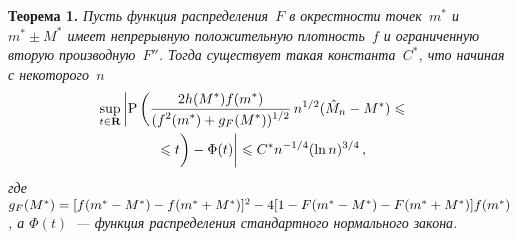 \begin{multicols}{2}
\medskip

\noindent
\textbf{Теорема 1.} \textit{Пусть функция распределения~$F$ в окрестности точек~$m^*$ 
и~$m^*\pm M^*$ имеет непрерывную положительную плотность~$f$ и ограниченную вторую 
производную~$F''$. Тогда существует такая константа~$C^*$, что начиная с некоторого~$n$
\begin{multline}
\!\!\!\sup\limits_{t\in\mathbf{R}}\left\vert\mathrm{P}\left(
\fr{2h(M^*)f(m^*)}{(f^2(m^*)+g_F(M^*))^{1/2}}\,
n^{1/2}(\hat{M}_n-M^*)\leqslant{}\right.\right.\\
\left.\left.{}\leqslant t
\vphantom{\fr{M^*}{g_F(M^*)^{1/2}}}
\right)-\Phi(t)
\vphantom{\fr{2h(M^*)f(m^*)}{(f^2(m^*)+g_F(M^*))^{1/2}}}
\right\vert\leqslant C^*n^{-1/4}(\ln n)^{3/4}\,,\label{e1-sh}
\end{multline}
где $g_F(M^*)\hm=[f(m^*-M^*)\hm-f(m^*+M^*)]^2\hm-4[1-F(m^*-M^*)\hm-F(m^*+M^*)]f(m^*)$, 
а $\Phi(t)$~--- функция распределения стандартного нормального закона.}

\medskip


\end{multicols}
